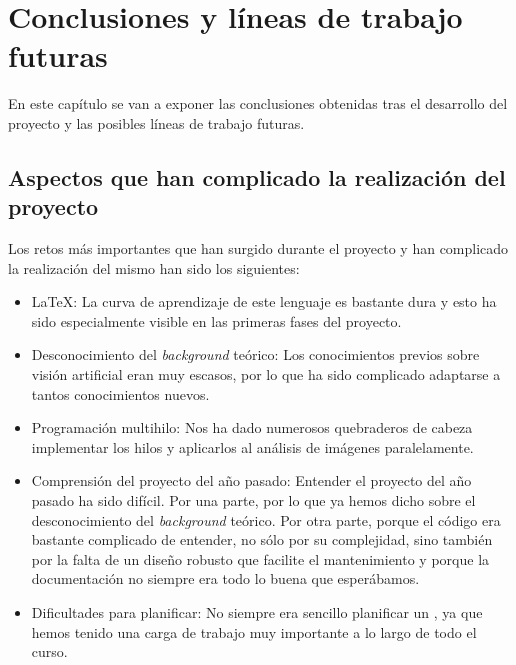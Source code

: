 \chapter{Conclusiones y líneas de trabajo futuras}

En este capítulo se van a exponer las conclusiones obtenidas tras el desarrollo del proyecto y las posibles líneas de trabajo futuras.


\section{Aspectos que han complicado la realización del proyecto}
Los retos más importantes que han surgido durante el proyecto y han complicado la realización del mismo han sido los siguientes:
\begin{itemize}
 \item \LaTeX{}: La curva de aprendizaje de este lenguaje es bastante dura y esto ha sido especialmente visible en las primeras fases del proyecto.
 \item Desconocimiento del \textit{background} teórico: Los conocimientos previos sobre visión artificial eran muy escasos, por lo que ha sido complicado adaptarse a tantos conocimientos nuevos. 
\item Programación multihilo: Nos ha dado numerosos quebraderos de cabeza implementar los hilos y aplicarlos al análisis de imágenes paralelamente.
\item Comprensión del proyecto del año pasado: Entender el proyecto del año pasado ha sido difícil. Por una parte, por lo que ya hemos dicho sobre el desconocimiento del \textit{background} teórico. Por otra parte, porque el código era bastante complicado de entender, no sólo por su complejidad, sino también por la falta de un diseño robusto que facilite el mantenimiento y porque la documentación no siempre era todo lo buena que esperábamos.
\item Dificultades para planificar: No siempre era sencillo planificar un \sprint{}, ya que hemos tenido una carga de trabajo muy importante a lo largo de todo el curso.
 
\end{itemize}

\newpage
